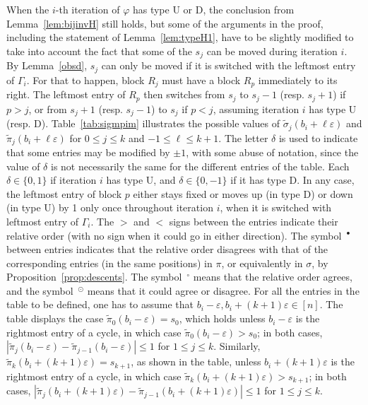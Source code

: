 \documentclass[11pt]{amsart}
\newcommand\wt{\widetilde}
\newcommand\bij{\varphi}
\newcommand\eps{\varepsilon}
\newcommand\sigm{\wt\sigma}
\newcommand\pim{\wt\pi}
\begin{document}
When the $i$-th iteration of $\bij$ has type U or D, the conclusion from Lemma~\ref{lem:bijinvH} still holds, but some of the arguments in the proof, including the statement of Lemma~\ref{lem:typeH1}, have to be slightly modified
to take into account the fact that some of the $s_j$ can be moved during iteration $i$. By Lemma~\ref{obsd}, $s_j$ can only be moved if it is switched with the leftmost entry of $\Gamma_i$. For that to happen, block $R_j$ must have a block $R_p$
immediately to its right.
The leftmost entry of $R_p$ then switches from $s_j$ to $s_j-1$ (resp. $s_j+1$) if $p>j$, or from $s_j+1$ (resp. $s_j-1$) to $s_j$ if $p<j$, assuming iteration $i$ has type U (resp. D).
Table~\ref{tab:sigmpim} illustrates the possible values of $\sigm_j(b_i+\ell\eps)$ and $\pim_j(b_i+\ell\eps)$ for $0\le j\le k$ and $-1\le \ell\le k+1$. The letter $\delta$ is used to indicate that
some entries may be modified by $\pm1$, with some abuse of notation, since the value of $\delta$ is not necessarily the same for the different entries of the table. Each $\delta\in\{0,1\}$ if iteration $i$ has type U, and
$\delta\in\{0,-1\}$ if it has type D.
In any case, the leftmost entry of block $p$ either stays fixed or moves up (in type D) or down (in type U)
by 1 only once throughout iteration $i$, when it is switched with leftmost entry of $\Gamma_i$.
The $>$ and $<$ signs between the entries indicate their relative order
(with no sign when it could go in either direction). The symbol~$^\bullet$ between entries indicates that the relative order disagrees with that of the corresponding entries (in the same positions) in $\pi$, or equivalently in $\sigma$, by Proposition~\ref{prop:descents}. The symbol~$^\circ$ means that the relative order agrees, and the symbol~$^\odot$ means that it could agree or disagree.
For all the entries in the table to be defined, one has to assume that $b_i-\eps,b_i+(k{+}1)\eps\in[n]$. The table displays the case $\pim_0(b_i-\eps)=s_0$, which holds
unless $b_i-\eps$ is the rightmost entry of a cycle, in which case $\pim_0(b_i-\eps)>s_0$; in both cases, $|\pim_j(b_i-\eps)-\pim_{j-1}(b_i-\eps)|\le 1$ for $1\le j\le k$.
Similarly, $\pim_k(b_i+(k{+}1)\eps)=s_{k+1}$, as shown in the table, unless $b_i+(k{+}1)\eps$ is the rightmost entry of a cycle, in which case $\pim_k(b_i+(k{+}1)\eps)>s_{k+1}$; in both cases, $|\pim_j(b_i+(k{+}1)\eps)-\pim_{j-1}(b_i+(k{+}1)\eps)|\le 1$ for $1\le j\le k$.
\end{document}
